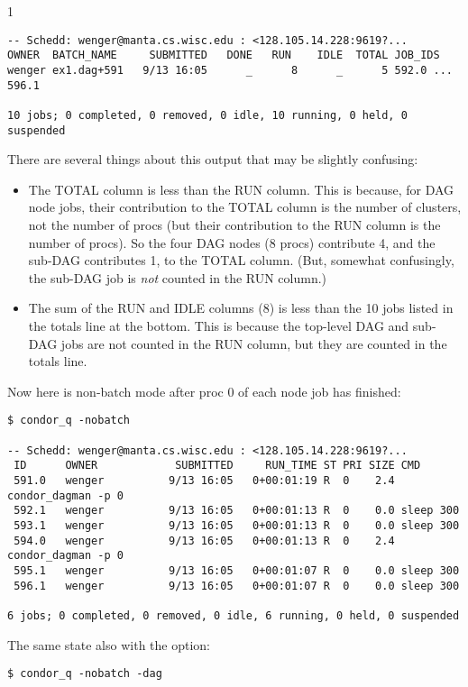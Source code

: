 \begin{ManPage}{\label{man-condor-q}}{1}
\begin{verbatim}
-- Schedd: wenger@manta.cs.wisc.edu : <128.105.14.228:9619?...
OWNER  BATCH_NAME     SUBMITTED   DONE   RUN    IDLE  TOTAL JOB_IDS
wenger ex1.dag+591   9/13 16:05      _      8      _      5 592.0 ... 596.1

10 jobs; 0 completed, 0 removed, 0 idle, 10 running, 0 held, 0 suspended
\end{verbatim}
\normalsize

There are several things about this output that may be slightly
confusing:
\begin{itemize}
\item The TOTAL column is less than the RUN column.  This is because,
for DAG node jobs, their contribution to the TOTAL column is the
number of clusters, not the number of procs (but their contribution
to the RUN column is the number of procs).  So the four DAG nodes
(8 procs) contribute 4, and the sub-DAG contributes 1, to the TOTAL column.
(But, somewhat confusingly, the sub-DAG job is \emph{not} counted
in the RUN column.)
\item The sum of the RUN and IDLE columns (8) is less than the 10
jobs listed in the totals line at the bottom.  This is because the
top-level DAG and sub-DAG jobs are not counted in the RUN column,
but they are counted in the totals line.
\end{itemize}

Now here is non-batch mode after proc 0 of each node job has finished:

\footnotesize
\begin{verbatim}
$ condor_q -nobatch

-- Schedd: wenger@manta.cs.wisc.edu : <128.105.14.228:9619?...
 ID      OWNER            SUBMITTED     RUN_TIME ST PRI SIZE CMD
 591.0   wenger          9/13 16:05   0+00:01:19 R  0    2.4 condor_dagman -p 0
 592.1   wenger          9/13 16:05   0+00:01:13 R  0    0.0 sleep 300
 593.1   wenger          9/13 16:05   0+00:01:13 R  0    0.0 sleep 300
 594.0   wenger          9/13 16:05   0+00:01:13 R  0    2.4 condor_dagman -p 0
 595.1   wenger          9/13 16:05   0+00:01:07 R  0    0.0 sleep 300
 596.1   wenger          9/13 16:05   0+00:01:07 R  0    0.0 sleep 300

6 jobs; 0 completed, 0 removed, 0 idle, 6 running, 0 held, 0 suspended
\end{verbatim}
\normalsize

The same state also with the  option:

\footnotesize
\begin{verbatim}
$ condor_q -nobatch -dag


\end{verbatim}
\end{ManPage}
